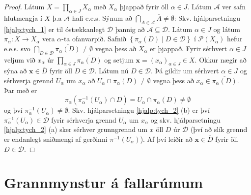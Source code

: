 \documentclass[a4paper,icelandic]{book}
\theoremstyle{definition}
\theoremstyle{plain}
\theoremstyle{remark}
\begin{document}
\begin{proof}
  Látum $X = \prod_{\alpha\in J} X_\alpha$ með $X_\alpha$ þjappað fyrir
  öll $\alpha\in J$. Látum $\mathcal A$ ver safn hlutmengja í $X$ þ.a
  $\mathcal A$ hafi e.e.s. Sýnum að $\bigcap_{A\in\mathcal A}\overline
  A\neq\emptyset$: Skv. hjálparsetningu \ref{hjalp:tych_1} er til
  óstækkanlegt $\mathcal D$ þannig að $\mathcal A\subseteq\mathcal D$.
  Látum $\alpha\in J$ og látum $\pi_\alpha:X\to X_\alpha$ vera
  $\alpha$-ta ofanvarpið. Safnið $\left\{ \pi_\alpha(D)\mid D\in\mathcal
  D\right\}$ í $\mathcal P(X_\alpha)$ hefur e.e.s. svo
  $\bigcap_{D\in\mathcal D}\overline{\pi_\alpha(D)}\neq\emptyset$ vegna
  þess að $X_\alpha$ er þjappað. Fyrir sérhvert $\alpha\in J$ veljum við
  $x_\alpha$ úr $\prod_{\alpha\in J}\overline{\pi_\alpha(D)}$ og setjum
  $\mathbf x = (x_\alpha)_{\alpha\in J} \in X$. Okkur nægir að sýna að
  $\mathbf x\in\overline D$ fyrir öll $D\in\mathcal D$. Látum nú
  $D\in\mathcal D$. Þá gildir um sérhvert $\alpha\in J$ og sérhverja
  grennd $U_\alpha$ um $x_\alpha$ að
  $U_\alpha\cap\pi_\alpha(D)\neq\emptyset$ vegna þess að
  $x_\alpha\in\overline{\pi_\alpha(D)}$. Þar með er\[
  \pi_\alpha\left( \pi_\alpha^{-1}(U_\alpha)\cap D \right)
  = U_\alpha\cap\pi_\alpha(D)
  \neq \emptyset
  \]
  og því $\pi_\alpha^{-1}(U_\alpha)\neq\emptyset$. Skv. hjálparsetningu
  \ref{hjalp:tych_2} (b) er því $\pi_\alpha^{-1}(U_\alpha)\in\mathcal D$
  fyrir sérhverja grennd $U_\alpha$ um $x_\alpha$ og skv.
  hjálparsetningu \ref{hjalp:tych_2} (a) sker sérhver grunngrennd um $x$
  öll $D$ úr $\mathcal D$ (því að slík grennd er endanlegt sniðmengi af
  gerðinni $\pi^{-1}(U_\alpha)$). Af því leiðir að $\mathbf
  x\in\overline D$ fyrir öll $D\in\mathcal D$. 
\end{proof}

\section{Grannmynstur á fallarúmum}
\end{document}

